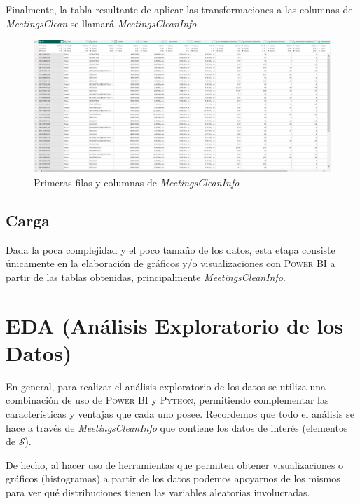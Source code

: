 \documentclass[11pt,a4paper]{book}
\theoremstyle{definition}%
\begin{document}
                Finalmente, la tabla resultante de aplicar las transformaciones a las columnas de \textit{MeetingsClean} se llamará \textit{MeetingsCleanInfo}.
                \begin{figure}[H]
                    \centering
                    \includegraphics[width=1\textwidth]{Sources/MeetingsCleanInfo_Head.png}
                    \caption{Primeras filas y columnas de \textit{MeetingsCleanInfo}}
                    \label{fig:meetingscleaninfo_head}
                \end{figure}
            \subsection{Carga}
                Dada la poca complejidad y el poco tamaño de los datos, esta etapa consiste únicamente en la elaboración de gráficos y/o visualizaciones con \textsc{Power BI} a partir de las tablas obtenidas, principalmente \textit{MeetingsCleanInfo}.
        \section{EDA (Análisis Exploratorio de los Datos)}
            En general, para realizar el análisis exploratorio de los datos se utiliza una combinación de uso de \textsc{Power BI} y \textsc{Python}, permitiendo complementar las características y ventajas que cada uno posee. Recordemos que todo el análisis se hace a través de \textit{MeetingsCleanInfo} que contiene los datos de interés (elementos de $\mathcal{S}$).
            
            De hecho, al hacer uso de herramientas que permiten obtener visualizaciones o gráficos (histogramas) a partir de los datos podemos apoyarnos de los mismos para ver qué distribuciones tienen las variables aleatorias involucradas.
            
\end{document}
